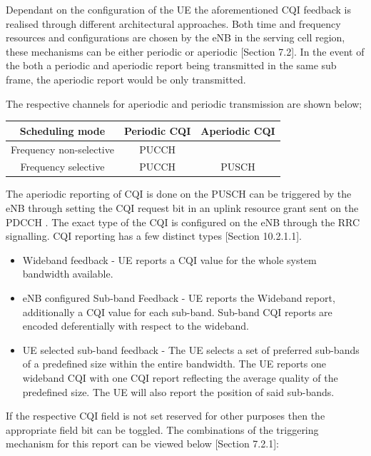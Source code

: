 \documentclass{article}
\begin{document}
Dependant on the configuration of the UE the aforementioned CQI feedback is realised through different architectural approaches. Both time and frequency resources and configurations are chosen by the eNB in the serving cell region, these mechanisms can be either periodic or aperiodic \cite{ETSITS136213}[Section 7.2]. In the event of the both a periodic and aperiodic report being transmitted in the same sub frame, the aperiodic report would be only transmitted. 

The respective channels for aperiodic and periodic transmission are shown below;
\begin{center}
 \begin{tabular}{||c c c||} 
 \hline
 Scheduling mode & Periodic CQI & Aperiodic CQI  \\ [0.1ex] 
 \hline\hline
 Frequency non-selective & PUCCH &  \\ 
 \hline
 Frequency selective  & PUCCH & PUSCH\\
 \hline
\end{tabular}
\end{center}
The aperiodic reporting of CQI is done on the PUSCH can be triggered by the eNB through setting the CQI request bit in an uplink resource grant sent on the PDCCH . The exact type of the CQI is configured on the eNB through the RRC signalling. CQI reporting has a few distinct types \cite{umts_sesia}[Section 10.2.1.1]. 
\begin{itemize}
    \item Wideband feedback - UE reports a CQI value for the whole system bandwidth available.
    \item eNB configured Sub-band Feedback - UE reports the Wideband report, additionally a CQI value for each sub-band. Sub-band CQI reports are encoded deferentially with respect to the wideband.
    \item UE selected sub-band feedback - The UE selects a set of preferred sub-bands of a predefined size within the entire bandwidth.  The UE reports one wideband CQI with one CQI report reflecting the average quality of the predefined size. The UE will also report the position of said sub-bands.
    
\end{itemize}

If the respective CQI field is not set reserved for other purposes then the appropriate field bit can be toggled. The combinations of the triggering mechanism for this report can be viewed below \cite{ETSITS136213}[Section 7.2.1]: 
\end{document}
